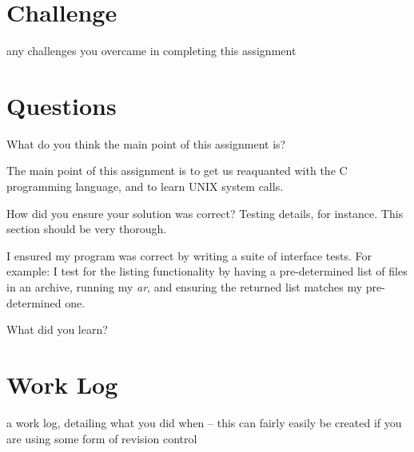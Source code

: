 \documentclass[letterpaper,10pt]{article}
\begin{document}
\section{Challenge}
    any challenges you overcame in completing this assignment

\section{Questions}
\begin{description}
  \item  What do you think the main point of this assignment is?

         The main point of this assignment is to get us reaquanted with
         the C programming language, and to learn UNIX system calls.

  \item  How did you ensure your solution was correct? Testing details, for
         instance. This section should be very thorough.

         I ensured my program was correct by writing a suite of
         interface tests. For example: I test for the listing
         functionality by having a pre-determined list of files in an
         archive, running my \emph{ar}, and ensuring the returned list
         matches my pre-determined one.

  \item  What did you learn?
\end{description}

\section{Work Log}
    a work log, detailing what you did when -- this can fairly easily be
    created if you are using some form of revision control
\end{document}
